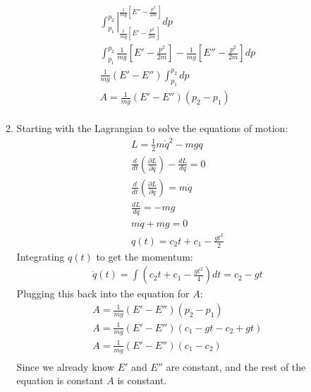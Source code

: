 \documentclass[12pt]{article}
\newcommand{\p}[2]{\frac{\partial #1}{\partial #2}}
\newcommand{\der}[2]{\frac{d #1}{d #2}}
\begin{document}
\begin{enumerate}
\begin{enumerate}
\begin{gather*}
                \left.\int_{p_1}^{p_2}\right|_{\frac{1}{mg}\left[E'-\frac{p^2}{2m}\right]}^{\frac{1}{mg}\left[E''-\frac{p^2}{2m}\right]}dp\\
                \left.\int_{p_1}^{p_2}\frac{1}{mg}\left[E'-\frac{p^2}{2m}\right]-\frac{1}{mg}\left[E''-\frac{p^2}{2m}\right]dp\\
                \frac{1}{mg}(E'-E'')\left.\int_{p_1}^{p_2}dp\\
                A=\frac{1}{mg}(E'-E'')(p_2-p_1)\\
            \end{gather*}
            \item
            Starting with the Lagrangian to solve the equations of motion:
            \begin{gather*}
                L=\frac{1}{2}m\dot{q}^2-mgq\\
                \frac{d}{dt}\left(\p{L}{\dot{q}}\right)-\der{L}{q}=0\\
                \frac{d}{dt}\left(\p{L}{\dot{q}}\right)=m\ddot{q}\\
                \der{L}{q}=-mg\\
                m\ddot{q}+mg=0\\
                q(t)=c_2 t+c_1-\frac{gt^2}{2}
            \end{gather*}
            Integrating $q(t)$ to get the momentum:
            \begin{gather*}
                \dot{q}(t)=\int\left( c_2 t+c_1-\frac{gt^2}{4} \right) dt=c_2-gt
            \end{gather*}
            Plugging this back into the equation for $A$:
            \begin{gather*}
                A=\frac{1}{mg}(E'-E'')(p_2-p_1)\\
                A=\frac{1}{mg}(E'-E'')(c_1-gt-c_2+gt)\\
                A=\frac{1}{mg}(E'-E'')(c_1-c_2)\\
            \end{gather*}
            Since we already know $E'$ and $E''$ are constant, and the rest of the equation is constant $A$ is constant.
        \end{enumerate}
    \end{enumerate}
\end{document}
